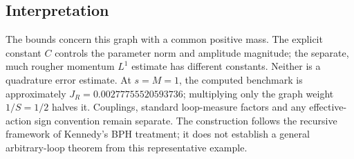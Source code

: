 \subsection{Interpretation}
The bounds concern this graph with a common positive mass. The explicit constant
\(C\) controls the parameter norm and amplitude magnitude; the separate,
much rougher momentum \(L^1\) estimate has different constants. Neither is a
quadrature error estimate. At \(s=M=1\), the computed benchmark is approximately
\(J_R=0.00277755520593736\); multiplying only the graph weight \(1/S=1/2\)
halves it. Couplings, standard loop-measure factors and any effective-action
sign convention remain separate. The construction follows the recursive
framework of Kennedy's BPH treatment; it does not establish a general
arbitrary-loop theorem from this representative example.
